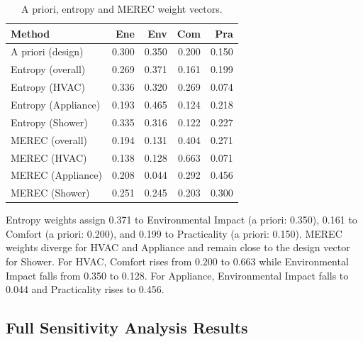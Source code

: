 \documentclass[11pt]{article}
\begin{document}
\begin{table}[htbp]
\caption{A priori, entropy and MEREC weight vectors.}
\label{tab:weight_comparison}
\small
\centering
\renewcommand{\arraystretch}{1.15}
\begin{tabular}{@{}l rrrr@{}}
\toprule
\textbf{Method} & Ene & Env & Com & Pra \\
\midrule
A priori (design)         & 0.300 & 0.350 & 0.200 & 0.150 \\
Entropy (overall)         & 0.269 & 0.371 & 0.161 & 0.199 \\
Entropy (HVAC)            & 0.336 & 0.320 & 0.269 & 0.074 \\
Entropy (Appliance)       & 0.193 & 0.465 & 0.124 & 0.218 \\
Entropy (Shower)          & 0.335 & 0.316 & 0.122 & 0.227 \\
\midrule
MEREC (overall)           & 0.194 & 0.131 & 0.404 & 0.271 \\
MEREC (HVAC)              & 0.138 & 0.128 & 0.663 & 0.071 \\
MEREC (Appliance)         & 0.208 & 0.044 & 0.292 & 0.456 \\
MEREC (Shower)            & 0.251 & 0.245 & 0.203 & 0.300 \\
\bottomrule
\end{tabular}
\renewcommand{\arraystretch}{1.0}
\end{table}

Entropy weights assign 0.371 to Environmental Impact (a priori: 0.350), 0.161 to Comfort (a priori: 0.200), and 0.199 to Practicality (a priori: 0.150). MEREC weights diverge for HVAC and Appliance and remain close to the design vector for Shower. For HVAC, Comfort rises from 0.200 to 0.663 while Environmental Impact falls from 0.350 to 0.128. For Appliance, Environmental Impact falls to 0.044 and Practicality rises to 0.456.

\subsection{Full Sensitivity Analysis Results}
\label{app:sensitivity_full}
\end{document}

